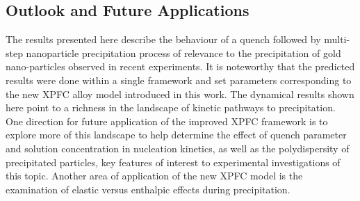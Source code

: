 \documentclass[showkeys, prb, reprint]{revtex4-1}
\begin{document}
\subsection{Outlook and Future Applications} %

The results presented here describe the behaviour of a quench followed by
multi-step nanoparticle precipitation process of relevance to the precipitation of gold
nano-particles observed in recent experiments. It is noteworthy that the
predicted results were done within a single framework and set parameters
corresponding to the new XPFC alloy model introduced in this work. The
dynamical results shown here point to a richness in the landscape of kinetic
pathways to precipitation. One direction for future application of the improved
XPFC framework is to explore more of this landscape to help determine the effect
of quench parameter and solution concentration in nucleation kinetics, as well
as the polydispersity of precipitated particles, key features of interest to
experimental investigations of this topic.  {\color{red}Another area of application of the new XPFC model is the examination of elastic versus enthalpic effects during precipitation.}


\end{document}
